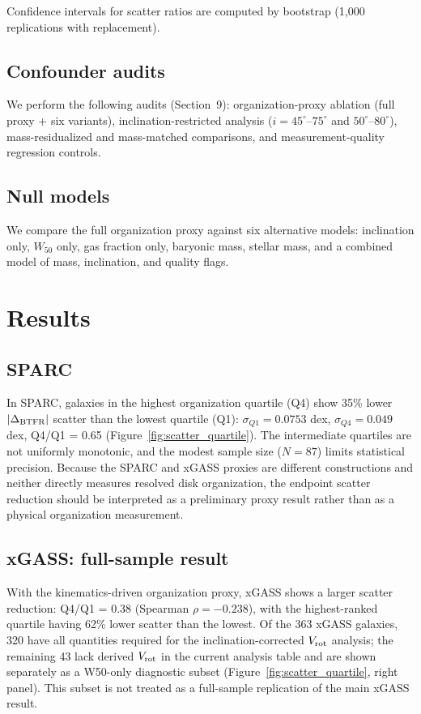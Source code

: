 \documentclass[11pt]{article}
\begin{document}
Confidence intervals for scatter ratios are computed by bootstrap (1,000 replications with replacement).

\subsection{Confounder audits}

We perform the following audits (Section~9): organization-proxy ablation (full proxy + six variants), inclination-restricted analysis ($i=45^\circ$--$75^\circ$ and $50^\circ$--$80^\circ$), mass-residualized and mass-matched comparisons, and measurement-quality regression controls.

\subsection{Null models}

We compare the full organization proxy against six alternative models: inclination only, $W_{50}$ only, gas fraction only, baryonic mass, stellar mass, and a combined model of mass, inclination, and quality flags.

\section{Results}

\subsection{SPARC}

In SPARC, galaxies in the highest organization quartile (Q4) show 35\% lower $|\Delta_{\rm BTFR}|$ scatter than the lowest quartile (Q1): $\sigma_{Q1} = 0.0753$ dex, $\sigma_{Q4} = 0.049$ dex, Q4/Q1 = 0.65 (Figure~\ref{fig:scatter_quartile}). The intermediate quartiles are not uniformly monotonic, and the modest sample size ($N=87$) limits statistical precision. Because the SPARC and xGASS proxies are different constructions and neither directly measures resolved disk organization, the endpoint scatter reduction should be interpreted as a preliminary proxy result rather than as a physical organization measurement.

\subsection{xGASS: full-sample result}

With the kinematics-driven organization proxy, xGASS shows a larger scatter reduction: Q4/Q1 = 0.38 (Spearman $\rho = -0.238$), with the highest-ranked quartile having 62\% lower scatter than the lowest. Of the 363 xGASS galaxies, 320 have all quantities required for the inclination-corrected $V_{\rm rot}$ analysis; the remaining 43 lack derived $V_{\rm rot}$ in the current analysis table and are shown separately as a W50-only diagnostic subset (Figure~\ref{fig:scatter_quartile}, right panel). This subset is not treated as a full-sample replication of the main xGASS result.
\end{document}

